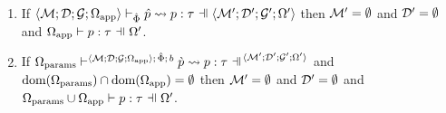\begin{theorem}\label{thm:typed-pattern-expansion-P} ~
\begin{enumerate}
  \item If $\pExpandsSP{\uOmegaEx{\uD}{\uG}{\uMctx}{\Omega_\text{app}}}{\uPhi}{\upv}{p}{\tau}{\uOmegaEx{\uD'}{\uG'}{\uMctx'}{\Omega'}}$ then $\mathcal{M}' = \emptyset$ and $\mathcal{D}' = \emptyset$ and $\patTypePC{\Omega_\text{app}}{\Omega'}{p}{\tau}$.
  \item If $\cvalidPP{\uOmegaEx{\uD'}{\uG'}{\uMctx'}{\Omega'}}{\pscene{\uOmegaEx{\uD}{\uG}{\uMctx}{\Omega_\text{app}}}{\uPhi}{b}}{\cpv}{p}{\tau}$ and $\text{dom}(\Omega_\text{params}) \cap \text{dom}(\Omega_\text{app}) = \emptyset$ then $\mathcal{M}' = \emptyset$ and $\mathcal{D}' = \emptyset$ and $\patTypePC{\Omega_\text{params} \cup \Omega_\text{app}}{\Omega'}{p}{\tau}$.
\end{enumerate}
\end{theorem}
